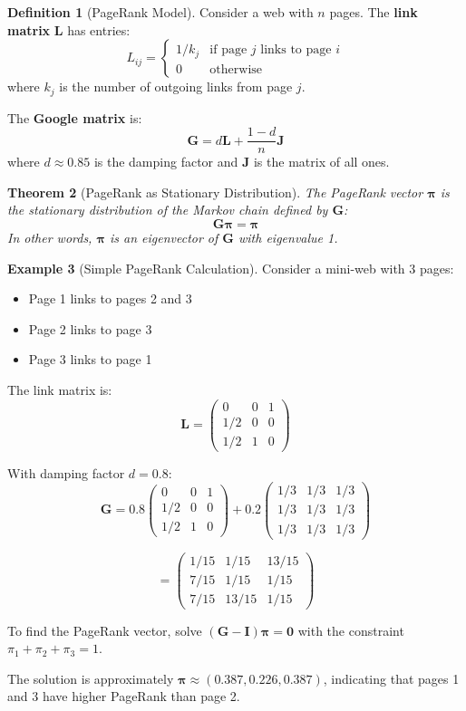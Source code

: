 \documentclass[12pt]{article}
\numberwithin{equation}{section}
\newcommand{\vect}[1]{\boldsymbol{#1}}   %
\newcommand{\mat}[1]{\mathbf{#1}}        %
\theoremstyle{plain}
\newtheorem{theorem}{Theorem}[section]
\theoremstyle{definition}
\newtheorem{definition}[theorem]{Definition}
\newtheorem{example}[theorem]{Example}
\theoremstyle{remark}
\begin{document}
\begin{definition}[PageRank Model]
Consider a web with $n$ pages. The \textbf{link matrix} $\mat{L}$ has entries:
$$L_{ij} = \begin{cases}
1/k_j & \text{if page } j \text{ links to page } i\\
0 & \text{otherwise}
\end{cases}$$
where $k_j$ is the number of outgoing links from page $j$.

The \textbf{Google matrix} is:
$$\mat{G} = d\mat{L} + \frac{1-d}{n}\mat{J}$$
where $d \approx 0.85$ is the damping factor and $\mat{J}$ is the matrix of all ones.
\end{definition}

\begin{theorem}[PageRank as Stationary Distribution]
The PageRank vector $\vect{\pi}$ is the stationary distribution of the Markov chain defined by $\mat{G}$:
$$\mat{G}\vect{\pi} = \vect{\pi}$$
In other words, $\vect{\pi}$ is an eigenvector of $\mat{G}$ with eigenvalue 1.
\end{theorem}

\begin{example}[Simple PageRank Calculation]
Consider a mini-web with 3 pages:
\begin{itemize}
\item Page 1 links to pages 2 and 3
\item Page 2 links to page 3
\item Page 3 links to page 1
\end{itemize}

The link matrix is:
$$\mat{L} = \begin{pmatrix} 0 & 0 & 1 \\ 1/2 & 0 & 0 \\ 1/2 & 1 & 0 \end{pmatrix}$$

With damping factor $d = 0.8$:
$$\mat{G} = 0.8\begin{pmatrix} 0 & 0 & 1 \\ 1/2 & 0 & 0 \\ 1/2 & 1 & 0 \end{pmatrix} + 0.2\begin{pmatrix} 1/3 & 1/3 & 1/3 \\ 1/3 & 1/3 & 1/3 \\ 1/3 & 1/3 & 1/3 \end{pmatrix}$$

$$= \begin{pmatrix} 1/15 & 1/15 & 13/15 \\ 7/15 & 1/15 & 1/15 \\ 7/15 & 13/15 & 1/15 \end{pmatrix}$$

To find the PageRank vector, solve $(\mat{G} - \mat{I})\vect{\pi} = \vect{0}$ with the constraint $\pi_1 + \pi_2 + \pi_3 = 1$.

The solution is approximately $\vect{\pi} \approx (0.387, 0.226, 0.387)$, indicating that pages 1 and 3 have higher PageRank than page 2.
\end{example}
\end{document}
